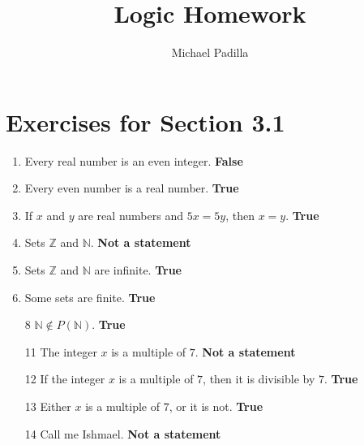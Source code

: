 \documentclass[12pt]{article}
\title{Logic Homework}
\author{Michael Padilla}
\begin{document}
 
\maketitle
\section*{Exercises for Section 3.1}
\begin{enumerate}
    \item Every real number is an even integer. \textbf{False}
    \item Every even number is a real number. \textbf{True}
    \item If $x$ and $y$ are real numbers and $5x=5y$, then $x=y$. \textbf{True}
    \item Sets $\mathbb{Z}$ and $\mathbb{N}$. \textbf{Not a statement}
    \item Sets $\mathbb{Z}$ and $\mathbb{N}$ are infinite. \textbf{True}
    \item Some sets are finite. \textbf{True}
    \item[8] $\mathbb{N} \notin P(\mathbb{N})$. \textbf{True}
    \item[11] The integer $x$ is a multiple of $7$. \textbf{Not a statement}
    \item[12] If the integer $x$ is a multiple of $7$, then it is divisible by $7$. \textbf{True}
    \item[13] Either $x$ is a multiple of $7$, or it is not. \textbf{True}
    \item[14] Call me Ishmael. \textbf{Not a statement}
\end{enumerate}
\end{document}
